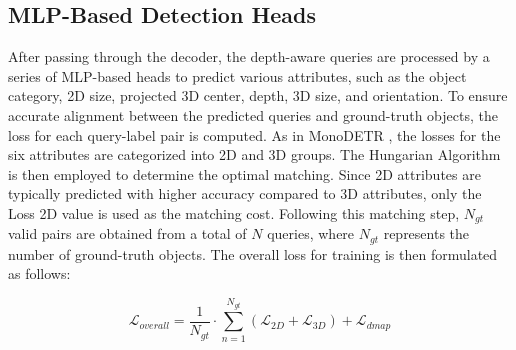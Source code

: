 \subsection{MLP-Based Detection Heads}
After passing through the decoder, the depth-aware queries are processed by a series of MLP-based heads to predict various attributes, such as the object category, 2D size, projected 3D center, depth, 3D size, and orientation.
To ensure accurate alignment between the predicted queries and ground-truth objects, the loss for each query-label pair is computed.  As in MonoDETR \cite{zhang2023monodetr}, the losses for the six attributes are categorized into 2D and 3D groups.
The Hungarian Algorithm \cite{kuhn1955hungarian} is then employed to determine the optimal matching. Since 2D attributes are typically predicted with higher accuracy compared to 3D attributes, only the Loss 2D value is used as the matching cost.
Following this matching step, $N_{gt}$ valid pairs are obtained from a total of $N$ queries, where $N_{gt}$ represents the number of ground-truth objects.
The overall loss for training is then formulated as follows:

\begin{equation}
\mathcal{L}_{overall} = \frac{1}{N_{gt}} \cdot \sum_{n=1}^{N_{gt}}{(\mathcal{L}_{2D}+\mathcal{L}_{3D})} + \mathcal{L}_{dmap}
\end{equation}
